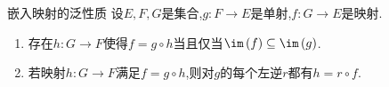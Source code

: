 \begin{proposition}{嵌入映射的泛性质}{}
	设$E,F,G$是集合,$g:F\to E$是单射,$f:G\to E$是映射.
	\begin{center}
	\end{center}
	\begin{enumerate}
		\item 存在$h:G\to F$使得$f=g\circ h$当且仅当$\im\left(f\right)\subseteq \im\left(g\right)$.
		\item 若映射$h:G\to F$满足$f=g\circ h$,则对$g$的每个左逆$r$都有$h=r\circ f$.
	\end{enumerate}
\end{proposition}






























